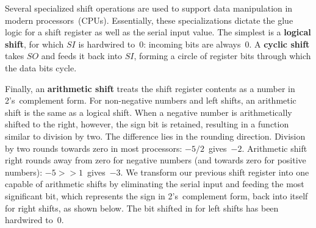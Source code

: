 Several specialized shift operations are used to support data
manipulation in modern processors~(CPUs).  Essentially, these
specializations dictate the glue logic for a shift
register as well as the serial input value.  The simplest is a {\bf
logical shift}, for which $SI$ is hardwired to~$0$: incoming
bits are always~$0$.  A {\bf cyclic shift} takes $SO$ and feeds it
back into $SI$, forming a circle of register bits through which the
data bits cycle.

Finally, an {\bf arithmetic shift} treats the shift register contents
as a number in 2's~complement form.  For non-negative numbers and left
shifts, an arithmetic shift is the same as a logical
shift.  When a negative number is arithmetically shifted to
the right, however, the sign bit is retained, resulting in a function
similar to division by two.  The difference lies in the rounding
direction.  Division by two rounds towards zero in most 
processors: $-5/2$~gives~$-2$.
Arithmetic shift right rounds away from zero for negative numbers (and
towards zero for positive numbers): $-5>>1$~gives~$-3$.  We transform our
previous shift register into one capable of arithmetic shifts by
eliminating the serial input and feeding the most significant bit,
which represents the sign in 2's~complement form, back into itself for
right shifts, as shown below.  The bit shifted in for left shifts
has been hardwired to~0.\vspace{4pt}

\centerline{}

\pagebreak

